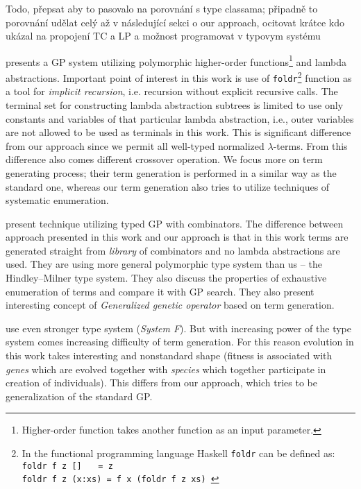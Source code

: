 \documentclass[11pt]{article}
\newcommand{\lterms}{$\lambda$-terms\xspace}
\newcommand{\red}[1]{{\color{red} #1}}
\begin{document}
\begin{article}
\red{Todo, přepsat aby to pasovalo na porovnání s type classama; připadně to porovnání udělat celý až v následující sekci o our approach, ocitovat krátce kdo ukázal na propojení TC a LP a možnost programovat v typovym systému}


\cite{yu01} presents a GP system utilizing
polymorphic higher-order functions\footnote{Higher-order 
function takes another function as an input parameter.
} and lambda abstractions.
Important point of interest in this work is use of \texttt{foldr}\footnote{ In the functional programming language Haskell \texttt{foldr} can be defined as:\\ \texttt{foldr f z [] $~~~$  = z\\ 
foldr f z (x:xs) = f x (foldr f z xs) }} function as a tool for \textit{implicit recursion},
i.e. recursion without explicit recursive calls. 
The terminal set for constructing lambda abstraction subtrees 
is limited to use only constants and variables of that particular
lambda abstraction, i.e., outer variables are not allowed to be used
as terminals in this work. This is significant difference from our approach 
since we permit all well-typed normalized \lterms. From this difference also
comes different crossover operation. We focus more on term generating process; 
their term generation is performed in a similar way as the standard one, 
whereas our term generation also tries to utilize techniques of systematic enumeration. 

\cite{kes} present technique 
utilizing typed GP with combinators.
The difference between approach presented in this work
and our approach is that in this work terms are generated
straight from \textit{library} of combinators and no lambda abstractions
are used. They are using more general polymorphic type system than us
-- the Hindley–Milner type system. They also discuss the 
properties of exhaustive enumeration of terms and compare it with GP search.  
They also present interesting concept of \textit{Generalized
genetic operator} based on term generation. 

\cite{binard2008genetic} use even 
stronger type system (\textit{System F}).  
But with increasing power of the type system comes increasing difficulty of term generation.
For this reason evolution in this work takes interesting and nonstandard shape 
(fitness is associated with \textit{genes} which are evolved together with \textit{species}
which together participate in creation of individuals).
This differs from our approach, which tries to be generalization of
the standard GP\citep{koza92}.


\end{article}
\end{document}
